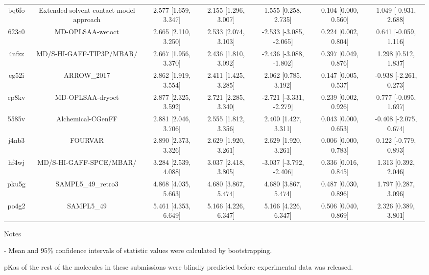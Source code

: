 \documentclass{article}
\begin{document}
\begin{center}
\begin{longtable}{|ccccccc|}
 bq6fo &            Extended solvent-contact model approach &  2.577 [1.659, 3.347] &  2.155 [1.296, 3.007] &     1.555 [0.258, 2.735] &  0.104 [0.000, 0.560] &   1.049 [-0.931, 2.688] \\
 623c0 &                                   MD-OPLSAA-wetoct &  2.665 [2.110, 3.250] &  2.533 [2.074, 3.103] &  -2.533 [-3.085, -2.065] &  0.224 [0.002, 0.804] &   0.641 [-0.059, 1.116] \\
 4nfzz &                           MD/S-HI-GAFF-TIP3P/MBAR/ &  2.667 [1.956, 3.370] &  2.436 [1.810, 3.092] &  -2.436 [-3.088, -1.802] &  0.397 [0.049, 0.876] &    1.298 [0.512, 1.837] \\
 eg52i &                                        ARROW\_2017 &  2.862 [1.919, 3.554] &  2.411 [1.425, 3.285] &     2.062 [0.785, 3.192] &  0.147 [0.005, 0.537] &  -0.938 [-2.261, 0.273] \\
 cp8kv &                                   MD-OPLSAA-dryoct &  2.877 [2.325, 3.592] &  2.721 [2.285, 3.340] &  -2.721 [-3.331, -2.279] &  0.239 [0.002, 0.926] &   0.777 [-0.095, 1.697] \\
 5585v &                                  Alchemical-CGenFF &  2.881 [2.046, 3.706] &  2.555 [1.812, 3.356] &     2.400 [1.427, 3.311] &  0.043 [0.000, 0.653] &  -0.408 [-2.075, 0.674] \\
 j4nb3 &                                            FOURVAR &  2.890 [2.373, 3.326] &  2.629 [1.920, 3.261] &     2.629 [1.920, 3.261] &  0.006 [0.000, 0.783] &   0.122 [-0.779, 0.893] \\
 hf4wj &                            MD/S-HI-GAFF-SPCE/MBAR/ &  3.284 [2.539, 4.088] &  3.037 [2.418, 3.805] &  -3.037 [-3.792, -2.406] &  0.336 [0.016, 0.845] &    1.313 [0.392, 2.046] \\
 pku5g &                                 SAMPL5\_49\_retro3 &  4.868 [4.035, 5.663] &  4.680 [3.867, 5.474] &     4.680 [3.867, 5.474] &  0.487 [0.030, 0.896] &    1.797 [0.287, 3.096] \\
 po4g2 &                                         SAMPL5\_49 &  5.461 [4.353, 6.649] &  5.166 [4.226, 6.347] &     5.166 [4.226, 6.347] &  0.506 [0.040, 0.869] &    2.326 [0.389, 3.801] \\
\end{longtable}
\end{center}

Notes

- Mean and 95\% confidence intervals of statistic values were calculated by bootstrapping.

pKas of the rest of the molecules in these submissions were blindly predicted before experimental data was released.
\end{document}
